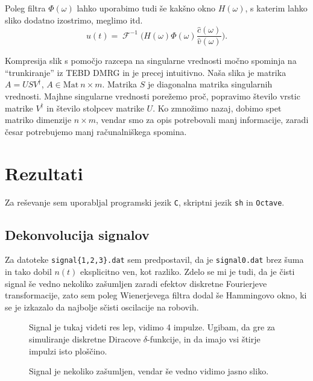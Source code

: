 \documentclass[a4 paper, 12pt]{article}
\newcommand{\F}{
	\operatorname{\mathcal{F}}
}
\newcommand{\w}{
	\ensuremath{\omega}
}
\begin{document}
Poleg filtra $\Phi(\w)$ lahko uporabimo tudi \v se kak\v sno okno $H(\w)$, s katerim lahko sliko dodatno izostrimo,
meglimo itd.
\begin{equation}
	u(t) = \F^{-1}\bigg(H(\w)\Phi(\w) \frac{\hat{c}(\w)}{\hat{v}(\w)}\bigg).
\end{equation}

Kompresija slik s pomo\v cjo razcepa na singularne vrednosti mo\v cno spominja na "`trunkiranje"' iz TEBD DMRG in
je precej intuitivno. Na\v sa slika je matrika $A = USV^\dagger$, $A \in \mathrm{Mat}\ n\times m$. Matrika $S$ je
diagonalna matrika singularnih vrednosti. Majhne singularne vrednosti pore\v zemo pro\v c, popravimo \v stevilo
vrstic matrike $V^\dagger$ in \v stevilo stolpcev matrike $U$. Ko zmno\v zimo nazaj, dobimo spet matriko dimenzije
$n \times m$, vendar smo za opis potrebovali manj informacije, zaradi \v cesar potrebujemo manj ra\v cunalni\v skega
spomina.

\section{Rezultati}

Za re\v sevanje sem uporabljal programski jezik {\tt C}, skriptni jezik {\tt sh} in {\tt Octave}.

\subsection{Dekonvolucija signalov}
Za datoteke {\tt signal\{1,2,3\}.dat} sem predpostavil, da je {\tt signal0.dat} brez \v suma in tako
dobil $n(t)$ eksplicitno ven, kot razliko. Zdelo se mi je tudi, da je \v cisti signal \v se vedno nekoliko
za\v sumljen zaradi efektov diskretne Fourierjeve transformacije, zato sem poleg Wienerjevega filtra dodal \v se
Hammingovo okno, ki se je izkazalo da najbolje s\v cisti oscilacije na robovih.

\begin{figure}[H]\centering
	
	\caption{Signal je tukaj videti res lep, vidimo 4 impulze. Ugibam, da gre za simuliranje
		diskretne Diracove $\delta$-funkcije, in da imajo vsi \v stirje impulzi isto
		plo\v s\v cino.}
\end{figure}

\begin{figure}[H]\centering
	
	\caption{Signal je nekoliko za\v sumljen, vendar \v se vedno vidimo jasno sliko.}
\end{figure}
\end{document}

